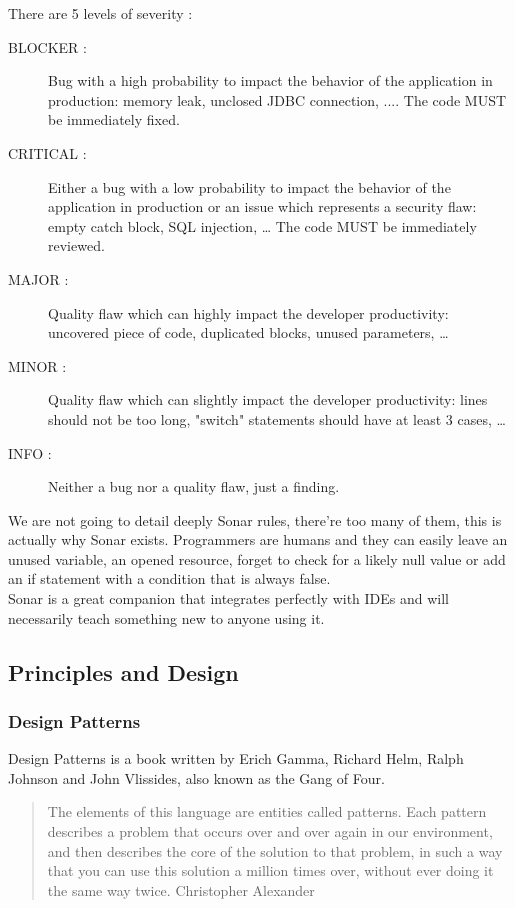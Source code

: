 There are 5 levels of severity :

\begin{description}
    \item[BLOCKER :]
Bug with a high probability to impact the behavior of the application
in production: memory leak, unclosed JDBC connection, ....
The code MUST be immediately fixed.
    \item[CRITICAL :]
Either a bug with a low probability to impact the behavior of the
application in production or an issue which represents a
security flaw: empty catch block, SQL injection, \ldots
The code MUST be immediately reviewed.
    \item[MAJOR :]
Quality flaw which can highly impact the developer productivity:
uncovered piece of code, duplicated blocks, unused parameters,
    \ldots
    \item[MINOR :]
Quality flaw which can slightly impact the developer productivity:
lines should not be too long, "switch" statements should have at
least 3 cases, \ldots
    \item[INFO :]
Neither a bug nor a quality flaw, just a finding.
\end{description}

We are not going to detail deeply Sonar rules, there're too many of them,
this is actually why Sonar exists.
Programmers are humans and they can easily leave an unused variable, an
opened resource, forget to check for a likely null value or add an if
statement with a condition that is always false. \\
Sonar is a great companion that integrates perfectly with IDEs and will
necessarily teach something new to anyone using it.

\subsection{Principles and Design}\label{subsec:principles}

\subsubsection{Design Patterns}
Design Patterns is a book written by Erich Gamma,
Richard Helm, Ralph Johnson and John Vlissides, also known as the
Gang of Four. \\

\begin{quotation}
    The elements of this language are entities called patterns.
    Each pattern describes a problem that occurs over and over again
    in our environment, and then describes the core of the solution to
    that problem, in such a way that you can use this solution a million
    times over, without ever doing it the same way twice.
    \textemdash Christopher Alexander
\end{quotation}


